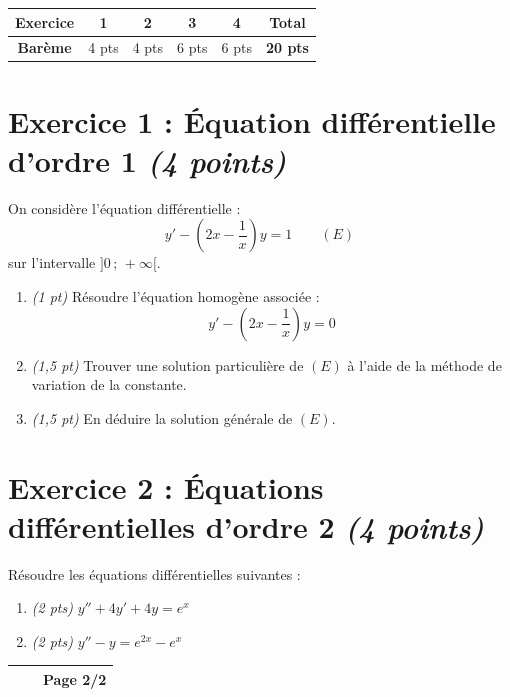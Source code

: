 \vspace{1em}

\begin{center}
    \renewcommand{\arraystretch}{1.3}
    \begin{tabular}{|c|c|c|c|c||c|}
        \hline
        \textbf{Exercice} & \textbf{1} & \textbf{2} & \textbf{3} & \textbf{4} & \textbf{Total} \\
        \hline
        \textbf{Barème} & 4 pts & 4 pts & 6 pts & 6 pts & \textbf{20 pts} \\
        \hline
    \end{tabular}
\end{center}

\vspace{1.5em}

\section*{Exercice 1 : Équation différentielle d'ordre 1 \hfill \normalfont\itshape (4 points)}
On considère l'équation différentielle :
$$y'-\left(2x-\frac{1}{x}\right)y=1 \qquad (E)$$
sur l'intervalle $]0\,;\,+\infty[$.
\begin{enumerate}[itemsep=0.4em]
    \item \textit{(1 pt)} Résoudre l'équation homogène associée :
    $$y'-\left(2x-\frac{1}{x}\right)y=0$$
    \item \textit{(1{,}5 pt)} Trouver une solution particulière de $(E)$ à l'aide de la méthode de variation de la constante.
    \item \textit{(1{,}5 pt)} En déduire la solution générale de $(E)$.
\end{enumerate}

\vspace{1em}

\section*{Exercice 2 : Équations différentielles d'ordre 2 \hfill \normalfont\itshape (4 points)}
Résoudre les équations différentielles suivantes :
\begin{enumerate}[itemsep=0.4em]
    \item \textit{(2 pts)} $y''+4y'+4y=e^x$
    \item \textit{(2 pts)} $y''-y=e^{2x}-e^x$
\end{enumerate}

\newpage

\begin{center}
    \renewcommand{\arraystretch}{1.5}
    \begin{tabular}{|>{\centering\arraybackslash}m{4cm}|>{\centering\arraybackslash}m{6cm}|>{\centering\arraybackslash}m{4cm}|}
        \hline
            \hspace{4cm}&\hspace{6cm} & \textbf{Page 2/2}\\
            \hline
    \end{tabular}
\end{center}

